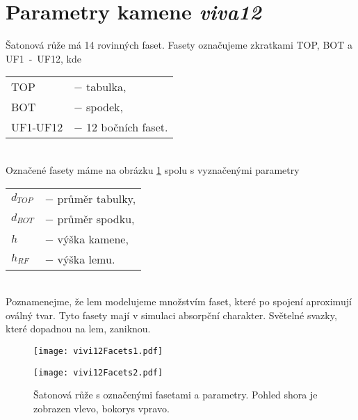 \part{Parametry kamene \textit{viva12}}
\label{sec: parametryVIVA12}

Šatonová růže má 14 rovinných faset. Fasety označujeme zkratkami TOP, BOT a\\ UF1~-~UF12, kde

\begin{tabular}{L{2cm} l}
TOP & $-$ tabulka,\\
BOT & $-$ spodek,\\
UF1-UF12 & $-$ 12 bočních faset.\\
\end{tabular}\\

Označené fasety máme na obrázku \ref{fig:viva12Params} spolu s vyznačenými parametry

\begin{tabular}{L{2cm} l}
$d_{TOP}$ &$-$ průměr tabulky,\\
$d_{BOT}$ &$-$ průměr spodku,\\
$h$ &$-$ výška kamene,\\
$h_{RF}$ & $-$ výška lemu. 
\end{tabular}\\
 
Poznamenejme, že lem modelujeme množstvím faset, které po spojení aproximují oválný tvar. Tyto fasety mají v simulaci absorpční charakter. Světelné svazky, které dopadnou na lem, zaniknou.   

\begin{figure}[htps]
\centering
\begin{minipage}[c]{0.4\textwidth}
\texttt{[image: vivi12Facets1.pdf]}
\end{minipage}
\begin{minipage}[c]{0.56\textwidth}
\texttt{[image: vivi12Facets2.pdf]}
\end{minipage}
\caption{Šatonová růže s označenými fasetami a parametry. Pohled shora je zobrazen vlevo, bokorys vpravo.}
\label{fig:viva12Params}
\end{figure}



\clearpage




